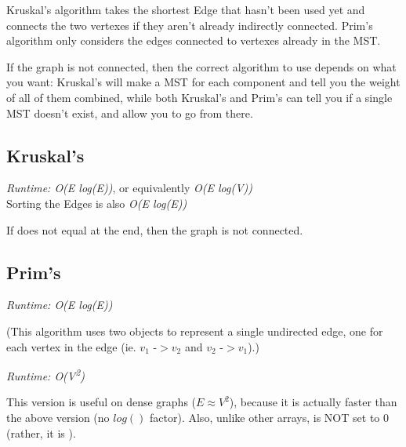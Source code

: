 
Kruskal's algorithm takes the shortest Edge that hasn't been used yet and connects the two vertexes if they aren't already indirectly connected. Prim's algorithm only considers the edges connected to vertexes already in the MST.

If the graph is not connected, then the correct algorithm to use depends on what you want: Kruskal's will make a MST for each component and tell you the weight of all of them combined, while both Kruskal's and Prim's can tell you if a single MST doesn't exist, and allow you to go from there.

\subsection*{Kruskal's}

\textit{Runtime: O(E log(E))}, or equivalently \textit{O(E log(V))} \\
\indent Sorting the Edges is also \textit{O(E log(E))}

If  does not equal  at the end, then the graph is not connected.



\subsection*{Prim's}

\textit{Runtime: O(E log(E))}

(This algorithm uses two  objects to represent a single undirected edge, one for each vertex in the edge (ie. $v_1$ -$> v_2$ and $v_2$ -$> v_1$).)



\textit{Runtime: O(V\textsuperscript{2})}

This version is useful on dense graphs ($E \approx V^2$), because it is actually faster than the above version (no $log()$ factor). Also, unlike other  arrays,  is NOT set to 0 (rather, it is ).



\newpage